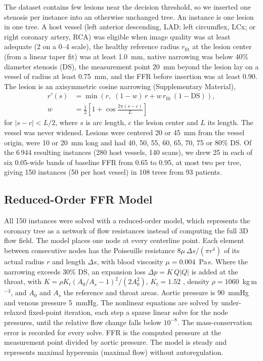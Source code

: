 \documentclass[journal]{IEEEtran}
\begin{document}
The dataset contains few lesions near the decision threshold, so we inserted one stenosis per instance into an
otherwise unchanged tree. An instance is one lesion in one tree. A host vessel (left anterior descending, LAD; left circumflex, LCx; or right coronary artery, RCA) was eligible
when image quality was at least adequate (2 on a 0--4 scale), the healthy reference radius $r_\mathrm{fit}$ at the
lesion center (from a linear taper fit) was at least 1.0~mm, native narrowing was below 40\% diameter stenosis (DS),
the measurement point 20~mm beyond the lesion lay on a vessel of radius at least 0.75~mm, and the FFR before
insertion was at least 0.90. The lesion is an axisymmetric cosine narrowing (Supplementary Material),
\begin{equation}
\begin{aligned}
r'(s) &= \min\!\left(r,\; (1-w)\,r + w\,r_\mathrm{fit}\,(1-\mathrm{DS})\right),\\
w &= \tfrac{1}{2}\left[1+\cos\tfrac{2\pi (s-c)}{L}\right]
\end{aligned}
\end{equation}
for $|s-c|<L/2$, where $s$ is arc length, $c$ the lesion center and $L$ its length. The vessel was never widened.
Lesions were centered 20 or 45~mm from the vessel origin, were 10 or 20~mm long and had 40, 50, 55, 60, 65, 70, 75
or 80\% DS. Of the 6\,944 resulting instances (280 host vessels, 140 scans), we drew 25 in each of six 0.05-wide bands of
baseline FFR from 0.65 to 0.95, at most two per tree, giving 150 instances (50 per host vessel) in 108 trees from 93
patients.

\subsection{Reduced-Order FFR Model}
All 150 instances were solved with a reduced-order model, which represents the coronary tree as a network of flow
resistances instead of computing the full 3D flow field. The model places one node at every centerline point. Each element between consecutive nodes has the Poiseuille
resistance $8\mu\,\Delta s/(\pi r^4)$ of its actual radius $r$ and length $\Delta s$, with blood viscosity
$\mu = 0.004$~Pa\,s. Where the narrowing exceeds 30\% DS, an expansion loss $\Delta p = K\,Q|Q|$ is added at the
throat, with $K = \rho K_t (A_0/A_s - 1)^2 / (2A_0^2)$, $K_t = 1.52$ \cite{young1973}, density
$\rho = 1060$~kg\,m$^{-3}$, and $A_0$ and $A_s$ the reference and throat areas. Aortic pressure is 90~mmHg and
venous pressure 5~mmHg. The nonlinear equations are solved by under-relaxed fixed-point iteration, each step a sparse linear
solve for the node pressures, until the relative flow change falls below $10^{-8}$. The mass-conservation error is recorded for every solve. FFR is the computed
pressure at the measurement point divided by aortic pressure. The model is steady and represents maximal hyperemia
(maximal flow) without autoregulation.
\end{document}
